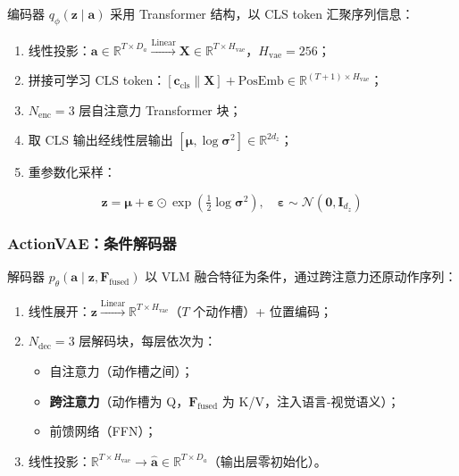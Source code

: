 \documentclass[10pt,twocolumn]{article}
\begin{document}
编码器 $q_\phi(\mathbf{z} \mid \mathbf{a})$ 采用 Transformer 结构，以 CLS token 汇聚序列信息：

\begin{enumerate}[leftmargin=*, label=\textbf{\arabic*.}]
  \item 线性投影：$\mathbf{a} \in \mathbb{R}^{T \times D_a} \xrightarrow{\text{Linear}} \mathbf{X} \in \mathbb{R}^{T \times H_{\text{vae}}}$，$H_{\text{vae}}=256$；
  \item 拼接可学习 CLS token：$[\mathbf{c}_{\text{cls}} \| \mathbf{X}] + \text{PosEmb} \in \mathbb{R}^{(T+1) \times H_{\text{vae}}}$；
  \item $N_{\text{enc}}=3$ 层自注意力 Transformer 块；
  \item 取 CLS 输出经线性层输出 $[\bm{\mu}, \log\bm{\sigma}^2] \in \mathbb{R}^{2d_z}$；
  \item 重参数化采样：
\end{enumerate}
\begin{equation}
  \mathbf{z} = \bm{\mu} + \bm{\varepsilon} \odot \exp\!\left(\tfrac{1}{2}\log\bm{\sigma}^2\right), \quad \bm{\varepsilon} \sim \mathcal{N}(\mathbf{0}, \mathbf{I}_{d_z})
  \label{eq:reparam}
\end{equation}

\subsubsection{ActionVAE：条件解码器}

解码器 $p_\theta(\mathbf{a} \mid \mathbf{z}, \mathbf{F}_{\text{fused}})$ 以 VLM 融合特征为条件，通过跨注意力还原动作序列：

\begin{enumerate}[leftmargin=*, label=\textbf{\arabic*.}]
  \item 线性展开：$\mathbf{z} \xrightarrow{\text{Linear}} \mathbb{R}^{T \times H_{\text{vae}}}$（$T$ 个动作槽）+ 位置编码；
  \item $N_{\text{dec}}=3$ 层解码块，每层依次为：
    \begin{itemize}[leftmargin=*]
      \item 自注意力（动作槽之间）；
      \item \textbf{跨注意力}（动作槽为 Q，$\mathbf{F}_{\text{fused}}$ 为 K/V，注入语言-视觉语义）；
      \item 前馈网络（FFN）；
    \end{itemize}
  \item 线性投影：$\mathbb{R}^{T \times H_{\text{vae}}} \to \hat{\mathbf{a}} \in \mathbb{R}^{T \times D_a}$（输出层零初始化）。
\end{enumerate}
\end{document}
